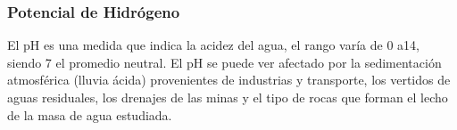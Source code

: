 \subsubsection{Potencial de Hidrógeno}
El pH es una medida que indica la acidez del agua, el rango varía de 0 a14, siendo 7 el promedio neutral. El pH se puede ver afectado por la sedimentación atmosférica (lluvia ácida) provenientes de industrias y transporte, los vertidos de aguas residuales, los drenajes de las minas y el tipo de rocas que forman el lecho de la masa de agua estudiada.




































